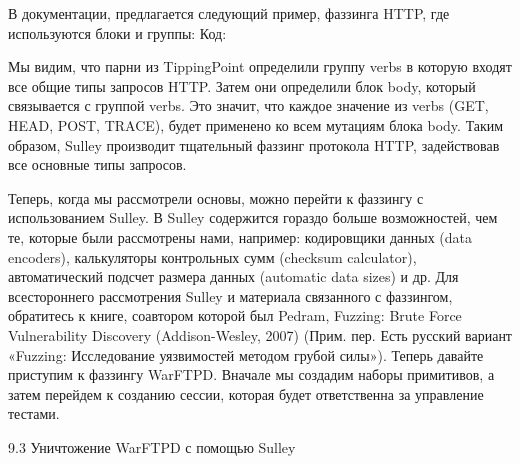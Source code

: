 \documentclass[12pt]{book}
\begin{document}
В документации, предлагается следующий пример, фаззинга HTTP, где используются блоки и группы:
Код:







Мы видим, что парни из TippingPoint определили группу verbs в которую входят все общие типы запросов HTTP. Затем они определили блок body, который связывается с группой verbs. Это значит, что каждое значение из verbs (GET, HEAD, POST, TRACE), будет применено ко всем мутациям блока body. Таким образом, Sulley производит тщательный фаззинг протокола HTTP, задействовав все основные типы запросов. 

Теперь, когда мы рассмотрели основы, можно перейти к фаззингу с использованием Sulley. В Sulley содержится гораздо больше возможностей, чем те, которые были рассмотрены нами, например: кодировщики данных (data encoders), калькуляторы контрольных сумм (checksum calculator), автоматический подсчет размера данных (automatic data sizes) и др. Для всестороннего рассмотрения Sulley и материала связанного с фаззингом, обратитесь к книге, соавтором которой был Pedram, Fuzzing: Brute Force Vulnerability Discovery (Addison-Wesley, 2007) (Прим. пер. Есть русский вариант «Fuzzing: Исследование уязвимостей методом грубой силы»). Теперь давайте приступим к фаззингу WarFTPD. Вначале мы создадим наборы примитивов, а затем перейдем к созданию сессии, которая будет ответственна за управление тестами. 


9.3 Уничтожение WarFTPD с помощью Sulley
\end{document}
